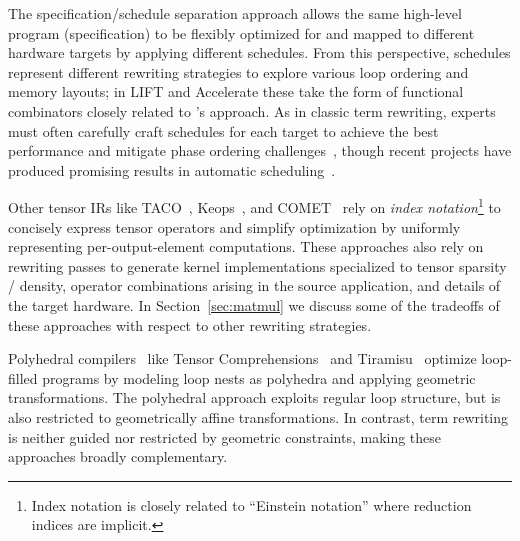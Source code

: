 The specification/schedule separation approach
  allows the same high-level program (specification)
  to be flexibly optimized for and mapped to
  different hardware targets by applying different schedules.
From this perspective,
  schedules represent different rewriting strategies
  to explore various loop ordering and memory layouts;
  in LIFT and Accelerate these
  take the form of functional combinators
  closely related to \g's approach.
As in classic term rewriting,
  experts must often carefully craft
  schedules for each target to achieve
  the best performance and mitigate
  phase ordering challenges~\cite{phase-ordering},
  though recent projects have produced promising results
  in automatic scheduling~\cite{
    chen2018autotvm, zheng2020ansor, anderson2020learning}.

Other tensor IRs like
  TACO~\cite{taco}, Keops~\cite{keops},
  and COMET~\cite{tian2021highperformance}
  rely on \textit{index notation}\footnote{
    Index notation is closely related to
    ``Einstein notation'' where reduction
    indices are implicit.}
  to concisely express tensor operators
  and simplify optimization by
  uniformly representing
  per-output-element computations.
These approaches also rely on
  rewriting passes to generate
  kernel implementations specialized to
  tensor sparsity / density,
  operator combinations arising in
  the source application, and
  details of the target hardware.
In Section~\ref{sec:matmul} we discuss
  some of the tradeoffs of these approaches
  with respect to other rewriting strategies.
 
Polyhedral compilers~\cite{polyhedral-survey}
  like Tensor Comprehensions~\cite{vasilache2018tensor}
  and Tiramisu~\cite{tiramisu}
  optimize loop-filled programs
  by modeling loop nests as polyhedra
  and applying geometric transformations.
The polyhedral approach exploits
  regular loop structure,
  but is also restricted
  to geometrically affine transformations.
In contrast, term rewriting is
  neither guided nor restricted by
  geometric constraints, making
  these approaches broadly complementary.




